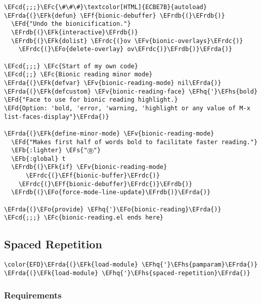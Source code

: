 \documentclass[a4wide,10pt]{article}
\newcommand{\EFc}[1]{\textcolor{EFc}{#1}} %
\newcommand{\EFcd}[1]{\textcolor{EFcd}{#1}} %
\newcommand{\EFs}[1]{\textcolor{EFs}{#1}} %
\newcommand{\EFd}[1]{\textcolor{EFd}{#1}} %
\newcommand{\EFk}[1]{\textcolor{EFk}{#1}} %
\newcommand{\EFb}[1]{\textcolor{EFb}{#1}} %
\newcommand{\EFf}[1]{\textcolor{EFf}{#1}} %
\newcommand{\EFv}[1]{\textcolor{EFv}{#1}} %
\newcommand{\EFo}[1]{\textcolor{EFo}{#1}} %
\newcommand{\EFhq}[1]{\textcolor{EFhq}{#1}} %
\newcommand{\EFhs}[1]{\textcolor{EFhs}{#1}} %
\newcommand{\EFrda}[1]{\textcolor{EFrda}{#1}} %
\newcommand{\EFrdb}[1]{\textcolor{EFrdb}{#1}} %
\newcommand{\EFrdc}[1]{\textcolor{EFrdc}{#1}} %
\begin{document}
\begin{Code}
\begin{Verbatim}
\EFcd{;;;}\EFc{\#\#\#}\textcolor[HTML]{ECBE7B}{autoload}
\EFrda{(}\EFk{defun} \EFf{bionic-debuffer} \EFrdb{(}\EFrdb{)}
  \EFd{"Undo the bionicification."}
  \EFrdb{(}\EFk{interactive}\EFrdb{)}
  \EFrdb{(}\EFk{dolist} \EFrdc{(}ov \EFv{bionic-overlays}\EFrdc{)}
    \EFrdc{(}\EFo{delete-overlay} ov\EFrdc{)}\EFrdb{)}\EFrda{)}

\EFcd{;;;} \EFc{Start of my own code}
\EFcd{;;} \EFc{Bionic reading minor mode}
\EFrda{(}\EFk{defvar} \EFv{bionic-reading-mode} nil\EFrda{)}
\EFrda{(}\EFk{defcustom} \EFv{bionic-reading-face} \EFhq{'}\EFhs{bold} \EFd{"Face to use for bionic reading highlight.}
\EFd{Option: 'bold, 'error, 'warning, 'highlight or any value of M-x list-faces-display"}\EFrda{)}

\EFrda{(}\EFk{define-minor-mode} \EFv{bionic-reading-mode}
  \EFd{"Makes first half of words bold to facilitate faster reading."}
  \EFb{:lighter} \EFs{"Ⓑ"}
  \EFb{:global} t
  \EFrdb{(}\EFk{if} \EFv{bionic-reading-mode}
      \EFrdc{(}\EFf{bionic-buffer}\EFrdc{)}
    \EFrdc{(}\EFf{bionic-debuffer}\EFrdc{)}\EFrdb{)}
  \EFrdb{(}\EFo{force-mode-line-update}\EFrdb{)}\EFrda{)}

\EFrda{(}\EFo{provide} \EFhq{'}\EFo{bionic-reading}\EFrda{)}
\EFcd{;;;} \EFc{bionic-reading.el ends here}
\end{Verbatim}
\end{Code}
\subsection{Spaced Repetition}
\label{sec:orgdf11260}
\begin{Code}
\begin{Verbatim}
\color{EFD}\EFrda{(}\EFk{load-module} \EFhq{'}\EFhs{pamparam}\EFrda{)}
\EFrda{(}\EFk{load-module} \EFhq{'}\EFhs{spaced-repetition}\EFrda{)}
\end{Verbatim}
\end{Code}
\subsubsection{Requirements}
\label{sec:org0020805}
\end{document}
